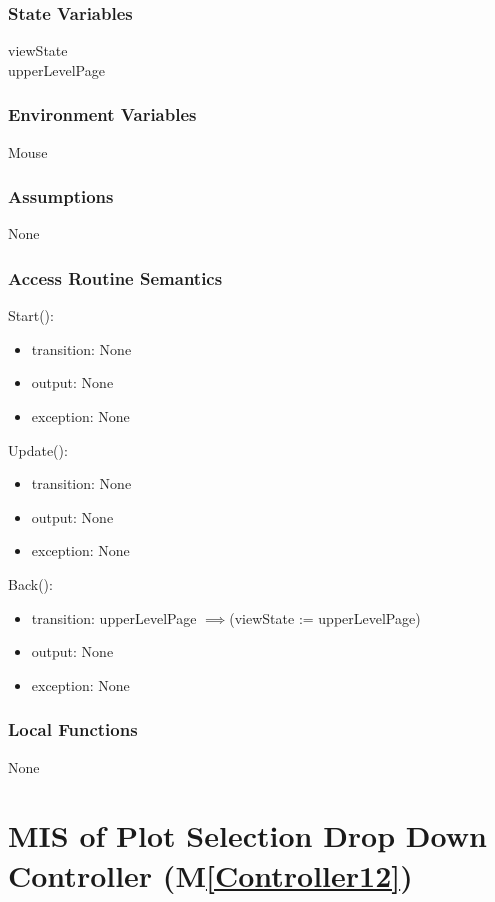 \documentclass[12pt, titlepage]{article}
\newcommand{\mref}[1]{M\ref{#1}}
\begin{document}
\subsubsection{State Variables}
viewState\\
upperLevelPage

\subsubsection{Environment Variables}
Mouse
\subsubsection{Assumptions}
None
\subsubsection{Access Routine Semantics}

\noindent Start():
\begin{itemize}
\item transition: None
\item output: None
\item exception: None
\end{itemize}


\noindent Update():
\begin{itemize}
\item transition: None
\item output: None
\item exception: None
\end{itemize}


\noindent Back():
\begin{itemize}
\item transition: upperLevelPage $\mathit{\implies}$(viewState := upperLevelPage)
\item output: None
\item exception: None
\end{itemize}


\subsubsection{Local Functions}
None


\newpage

\section{MIS of Plot Selection Drop Down Controller (\mref{Controller12})} 
\end{document}
